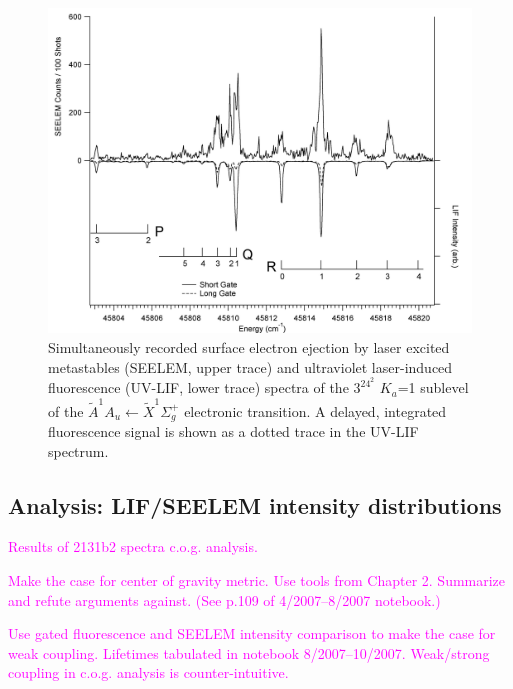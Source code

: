 \documentclass[12pt,draft]{mitthesis}
\newcommand{\POINT}[1]{\textcolor{magenta}{#1}}
\begin{document}
\begin{figure}
  \caption{
    Simultaneously recorded surface electron ejection by laser excited
    metastables (SEELEM, upper trace) and ultraviolet laser-induced
    fluorescence (UV-LIF, lower trace) spectra of the $3^24^2$ $K_a$=1
    sublevel of the $\tilde{A}^1A_u \leftarrow \tilde{X} ^1\Sigma_g^+$
    electronic transition. A delayed, integrated fluorescence signal
    is shown as a dotted trace in the UV-LIF spectrum.}
  \label{fig:spectrum-32b2}
  \centering
  \includegraphics[width=7.5in,angle=90]{spectrum-32b2.png}
\end{figure}

\subsection{Analysis: LIF/SEELEM intensity distributions}

\POINT{Results of 2131b2 spectra c.o.g. analysis.}

\POINT{Make the case for center of gravity metric. Use tools from
  Chapter 2.  Summarize and refute arguments against.  (See p.109 of
  4/2007--8/2007 notebook.)}


\POINT{Use gated fluorescence and SEELEM intensity comparison to make
  the case for weak coupling. Lifetimes tabulated in notebook
  8/2007--10/2007.  Weak/strong coupling in c.o.g. analysis is
  counter-intuitive.}
\end{document}
